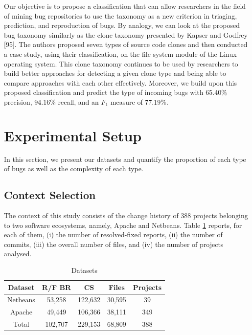 \documentclass[12pt]{report}
\begin{document}
Our objective is to propose a classification that can allow researchers
in the field of mining bug repositories to use the taxonomy as a new
criterion in triaging, prediction, and reproduction of bugs. By analogy,
we can look at the proposed bug taxonomy similarly as the clone taxonomy
presented by Kapser and Godfrey {[}95{]}. The authors proposed seven
types of source code clones and then conducted a case study, using their
classification, on the file system module of the Linux operating system.
This clone taxonomy continues to be used by researchers to build better
approaches for detecting a given clone type and being able to compare
approaches with each other effectively. Moreover, we build upon this
proposed classification and predict the type of incoming bugs with 
65.40\% precision, 94.16\% recall, and an \(F_1\) measure of 77.19\%.

\section{Experimental Setup}\label{experimental-setup-4}

In this section, we present our datasets and quantify the proportion of each type of bugs as well as
the complexity of each type.

\subsection{\texorpdfstring{Context
Selection\label{sec:context-selection}}{Context Selection}}\label{context-selection}

The context of this study consists of the change history of 388 projects
belonging to two software ecosystems, namely, Apache and Netbeans. Table
\ref{table:datasets} reports, for each of them, (i) the number of
resolved-fixed reports, (ii) the number of commits, (iii) the overall
number of files, and (iv) the number of projects analysed.

\begin{table}[h]
\begin{center}
\begin{tabular}{@{}c|c|c|c|c@{}}
\textbf{Dataset} & \textbf{R/F BR} & \textbf{CS} & \textbf{Files} & \textbf{Projects} \\ \hline \hline
Netbeans         & 53,258          & 122,632     & 30,595         & 39                \\
Apache           & 49,449          & 106,366     & 38,111         & 349               \\
Total            & 102,707         & 229,153     & 68,809         & 388               \\ \hline \hline

\end{tabular}
\end{center}

\caption{Datasets\label{table:datasets}}
\end{table}
\end{document}
